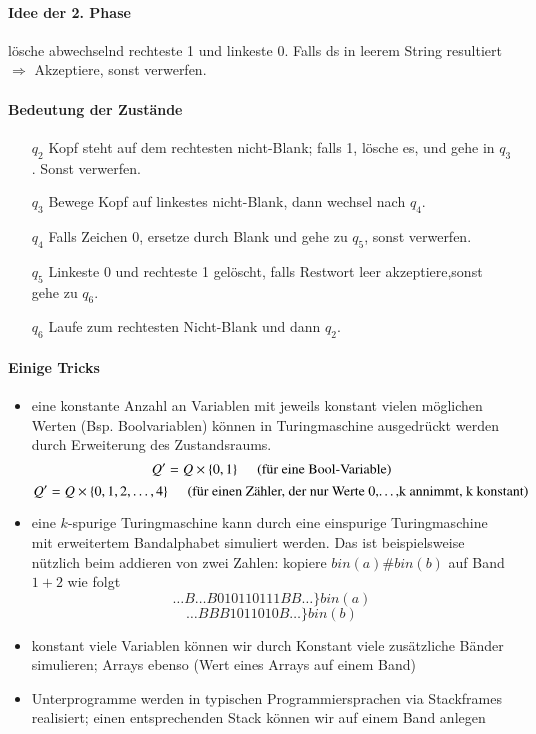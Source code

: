 \paragraph*{Idee der 2. Phase} lösche abwechselnd rechteste 1 und linkeste 0. Falls ds in leerem String resultiert $\Rightarrow$ Akzeptiere, sonst verwerfen.

\paragraph*{Bedeutung der Zustände}
\begin{itemize}
	\item[$q_2$] Kopf steht auf dem rechtesten nicht-Blank; falls 1, lösche es, und gehe in $q_3$. Sonst verwerfen.
	\item[$q_3$] Bewege Kopf auf linkestes nicht-Blank, dann wechsel nach $q_4$.
	\item[$q_4$] Falls Zeichen 0, ersetze durch Blank und gehe zu $q_5$, sonst verwerfen.
	\item[$q_5$] Linkeste 0 und rechteste 1 gelöscht, falls Restwort leer akzeptiere,sonst gehe zu $q_6$.
	\item[$q_6$] Laufe zum rechtesten Nicht-Blank und dann $q_2$.
\end{itemize}


\paragraph*{Einige Tricks}
\begin{itemize}
	\item eine konstante Anzahl an Variablen mit jeweils konstant vielen möglichen Werten (Bsp. Boolvariablen) können in Turingmaschine ausgedrückt werden durch Erweiterung des Zustandsraums. $$ Q'=Q \times \{0,1\} \hspace{0.5cm}\text{(für eine Bool-Variable)}$$ $$ Q'=Q \times \{ 0,1,2,\dots,4 \} \hspace{0.5cm}\text{(für einen Zähler, der nur Werte 0,\dots,k annimmt, k konstant)} $$
	\item eine $k$-spurige Turingmaschine kann durch eine einspurige Turingmaschine mit erweitertem Bandalphabet simuliert werden. Das ist beispielsweise nützlich beim addieren von zwei Zahlen: kopiere $bin(a)\#bin(b)$ auf Band $1+2$ wie folgt $$ \dots B \dots B010110111BB \dots \} bin(a) $$ $$ \dots BBB1011010B \dots \} bin(b) $$
	\item konstant viele Variablen können wir durch Konstant viele zusätzliche Bänder simulieren; Arrays ebenso (Wert eines Arrays auf einem Band)
	\item Unterprogramme werden in typischen Programmiersprachen via Stackframes realisiert; einen entsprechenden Stack können wir auf einem Band anlegen
\end{itemize}